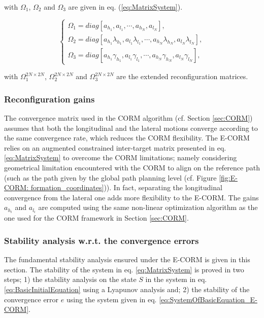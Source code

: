\noindent with $\Omega_{1}$, $\Omega_{2}$ and $\Omega_{3}$ are given in eq. (\ref{eq:MatrixSystem}).

\begin{equation}\label{eq:MatrixSystem}
\begin{cases}
    \Omega_{1}=diag[a_{h_{1}},a_{l_{1}},\cdots,a_{h_{N}},a_{l_{N}}],\\
    \Omega_{2}=diag[a_{h_{1}}\lambda_{h_{1}},a_{l_{1}}\lambda_{l_{1}},\cdots,a_{h_{N}}\lambda_{h_{N}},a_{l_{N}}\lambda_{l_{N}}],\\
    \Omega_{3}=diag[a_{h_{1}}\gamma_{h_{1}},a_{l_{1}}\gamma_{l_{1}},\cdots,a_{h_{N}}\gamma_{h_{N}},a_{l_{N}}\gamma_{l_{N}}],
\end{cases}
\end{equation}



\noindent with $\Omega_{1}^{2N\times 2N}$, $\Omega_{2}^{2N\times 2N}$ and $\Omega_{3}^{2N\times 2N}$  are the extended reconfiguration matrices. 

\subsubsection{Reconfiguration gains} \label{sec:ReconfigurationGains}
The convergence matrix used in the CORM algorithm (cf. Section \ref{sec:CORM}) assumes that both the longitudinal and the lateral motions converge according to the same convergence rate, which reduces the CORM flexibility. The E-CORM relies on an augmented constrained inter-target matrix presented in eq. \ref{eq:MatrixSystem} to overcome the CORM limitations; namely considering geometrical limitation encountered with the CORM to align on the reference path (such as the path given by the global path planning level (cf. Figure \ref{fig:E-CORM: formation_coordinates})). In fact, separating the longitudinal convergence from the lateral one adds more flexibility to the E-CORM. The gains $a_{h_i}$ and $a_{l_i}$ are computed using the same non-linear optimization algorithm as the one used for the CORM framework in Section \ref{sec:CORM}.

\subsubsection{Stability analysis w.r.t. the convergence errors} \label{sec:stability_analysis}
The fundamental stability analysis ensured under the E-CORM is given in this section. The stability of the system in eq. \ref{eq:MatrixSystem} is proved in two steps; 1) the stability analysis on the state $S$ in the system in eq. \ref{eq:BasicInitialEquation} using a Lyapunov analysis %
and; 2) the stability of the convergence error $e$ using the system given in eq. \ref{eq:SystemOfBasicEquation_E-CORM}. 

